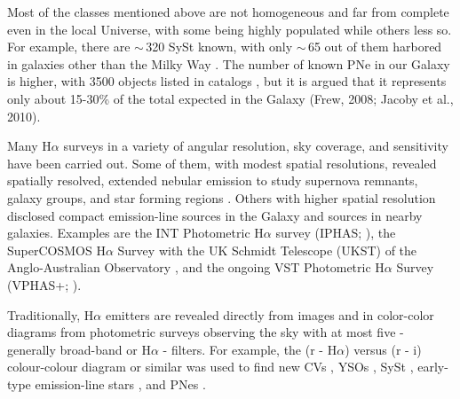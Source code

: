 \documentclass[fleqn,usenatbib]{mnras}
\begin{document}
Most of the classes mentioned above are not homogeneous 
and far from complete even in the local Universe, with some being highly populated while others less so. For example, 
there are $\sim$\,320 SySt known, with only $\sim$\,65 out of them harbored in galaxies other than the Milky Way \citep{Akras:2019a}.
The number of known PNe in our Galaxy is higher, with 3500 objects listed in catalogs \citep{Parker:2016}, but it is argued that it represents only about 15-30\% of the total expected in the Galaxy (Frew, 2008; Jacoby et al., 2010).

Many H$\alpha$ surveys in a variety of angular resolution, sky coverage, 
and sensitivity have been carried out.
Some of them, with modest spatial resolutions, revealed 
spatially resolved, extended nebular emission to study supernova remnants, galaxy
groups, and star forming regions \citep[e.g.][]{1976MmRAS..81...89D}. 
Others with 
higher 
spatial resolution 
disclosed compact emission-line sources
in the Galaxy and sources in nearby galaxies.
Examples are the INT Photometric H$\alpha$ survey
(IPHAS; \citealt{Drew:2005, Barentsen:2014}), the  SuperCOSMOS H$\alpha$ Survey with the UK Schmidt Telescope (UKST) of the Anglo-Australian Observatory \citep{2005MNRAS.362..689P}, and the ongoing VST Photometric H$\alpha$ Survey (VPHAS+; \citealt{Drew:2014}).

Traditionally, H$\alpha$ emitters are revealed directly from images and in color-color diagrams from photometric surveys observing the sky with at most five - generally broad-band or H$\alpha$ - filters.
For example, the (r - H$\alpha$) versus (r - i) colour-colour diagram or similar was used
to find new 
CVs \citep{Witham:2006,Witham:2007}, 
YSOs \citep{Vink:2008}, 
SySt \citep{Corradi:2008, Corradi:2010, Corradi:2011}, 
early-type emission-line stars \citep{Drew:2008}, 
and PNes \citep{Viirone:2009, Sabin:2010}. 
\end{document}
